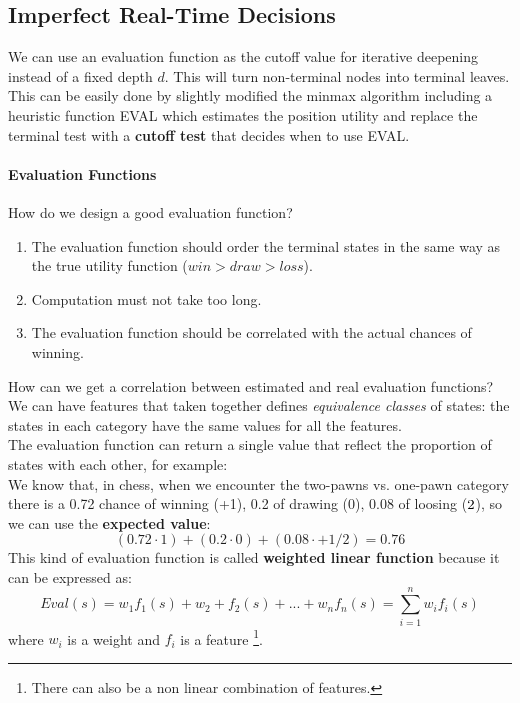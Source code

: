 \documentclass[10pt,a4paper]{article}
\begin{document}
\subsection{Imperfect Real-Time Decisions}

We can use an evaluation function as the cutoff value for iterative deepening instead of a fixed depth $d$. This will turn non-terminal nodes into terminal leaves. This can be easily done by slightly modified the minmax algorithm including a heuristic function EVAL which estimates the position utility and replace the terminal test with a \textbf{cutoff test} that decides when to use EVAL.

\paragraph{Evaluation Functions}
How do we design a good evaluation function?
\begin{enumerate}
\item The evaluation function should order the terminal states in the same way as the true utility function ($win> draw> loss$).
\item Computation must not take too long.
\item The evaluation function should be correlated with the actual chances of winning.
\end{enumerate}

How can we get a correlation between estimated and real evaluation functions?\\

We can have features that taken together defines \textit{equivalence classes} of states: the states in each category have the same values for all the features.\\
The evaluation function can return a single value that reflect the proportion of states with each other, for example:\\ 
We know that, in chess, when we encounter the two-pawns vs. one-pawn category there is a 0.72 chance of winning (+1), 0.2 of drawing (0), 0.08 of loosing ($\/2$), so we can use the \textbf{expected value}: 
\[(0.72\cdot 1)+(0.2 \cdot 0)+(0.08 \cdot +1/2)=0.76\]
This kind of evaluation function is called \textbf{weighted linear function} because it can be expressed as:
\[Eval(s)=w_1f_1(s)+w_2+f_2(s)+...+w_nf_n(s)=\sum_{i=1}^nw_if_i(s)\]
where $w_i$ is a weight and $f_i$ is a feature \footnote{There can also be a non linear combination of features.}.
\end{document}
